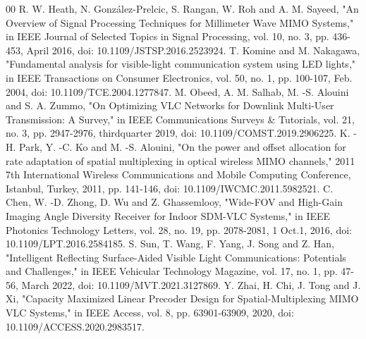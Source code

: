\documentclass[conference]{IEEEtran}
\begin{document}
\begin{thebibliography}{00}
 R. W. Heath, N. González-Prelcic, S. Rangan, W. Roh and A. M. Sayeed, "An Overview of Signal Processing Techniques for Millimeter Wave MIMO Systems," in IEEE Journal of Selected Topics in Signal Processing, vol. 10, no. 3, pp. 436-453, April 2016, doi: 10.1109/JSTSP.2016.2523924.
	T. Komine and M. Nakagawa, "Fundamental analysis for visible-light communication system using LED lights," in IEEE Transactions on Consumer Electronics, vol. 50, no. 1, pp. 100-107, Feb. 2004, doi: 10.1109/TCE.2004.1277847. 
	M. Obeed, A. M. Salhab, M. -S. Alouini and S. A. Zummo, "On Optimizing VLC Networks for Downlink Multi-User Transmission: A Survey," in IEEE Communications Surveys \& Tutorials, vol. 21, no. 3, pp. 2947-2976, thirdquarter 2019, doi: 10.1109/COMST.2019.2906225.
 K. -H. Park, Y. -C. Ko and M. -S. Alouini, "On the power and offset allocation for rate adaptation of spatial multiplexing in optical wireless MIMO channels," 2011 7th International Wireless Communications and Mobile Computing Conference, Istanbul, Turkey, 2011, pp. 141-146, doi: 10.1109/IWCMC.2011.5982521.
	C. Chen, W. -D. Zhong, D. Wu and Z. Ghassemlooy, "Wide-FOV and High-Gain Imaging Angle Diversity Receiver for Indoor SDM-VLC Systems," in IEEE Photonics Technology Letters, vol. 28, no. 19, pp. 2078-2081, 1 Oct.1, 2016, doi: 10.1109/LPT.2016.2584185.
	S. Sun, T. Wang, F. Yang, J. Song and Z. Han, "Intelligent Reflecting Surface-Aided Visible Light Communications: Potentials and Challenges," in IEEE Vehicular Technology Magazine, vol. 17, no. 1, pp. 47-56, March 2022, doi: 10.1109/MVT.2021.3127869.
	Y. Zhai, H. Chi, J. Tong and J. Xi, "Capacity Maximized Linear Precoder Design for Spatial-Multiplexing MIMO VLC Systems," in IEEE Access, vol. 8, pp. 63901-63909, 2020, doi: 10.1109/ACCESS.2020.2983517.

\end{thebibliography}
\end{document}

